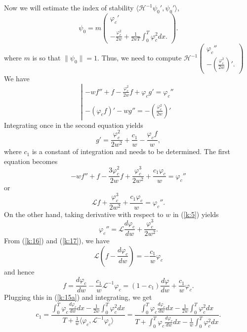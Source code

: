 \documentclass[final,11pt,leqno]{amsart}
\begin{document}
Now we will estimate the index of stability $\langle {\mathcal H}^{-1} \psi_0', \psi_0'\rangle$,
$$
\psi_0=m\left( \begin{array}{cc}
  {\varphi}_c'\\
  \\
  -{\frac{{\varphi}_c^2}{2w}}+{\frac{1}{2wT}}\int_{0}^{T}{{\varphi}_c^2}dx.
  \end{array}\right).
  $$
where $m$ is so that $\|\psi_0\|=1$.  Thus, we need to compute $ {\mathcal H}^{-1}\left( \begin{array}{cc}
  {\varphi}_c''\\
  -({\frac{{\varphi}_c^2}{2w}})'.
  \end{array}\right)$ We have
    $$\left| \begin{array}{ll}
    -wf''+f-{\frac{{\varphi}_c^2}{2w}}f+{\varphi}_cg'={\varphi}_c'' \\
    \\
    -({\varphi}_cf)'-wg''=-\left( {\frac{{\varphi}_c^2}{2w}}\right)'\end{array}
    \right. $$
    Integrating once in the second equation yields
      \begin{equation}\label{k:15a}
      g'={\frac{{\varphi}_c^2}{2w^2}}+{\frac{c_1}{w}}-{\frac{{\varphi}_cf}{w}},
      \end{equation}
      where $c_1$ is a constant of integration and needs to be determined.
The first equation becomes
        $$-wf''+f-{\frac{3{\varphi}_c^2}{2w}}f+{\frac{{\varphi}_c^3}{2w^2}}+{\frac{c_1{\varphi}_c}{w}}={\varphi}_c''$$
        or
        \begin{equation}\label{k:16}
        {\mathcal L} f+{\frac{{\varphi}_c^3}{2w^2}}+{\frac{c_1{\varphi}_c}{w}}={\varphi}_c''.
        \end{equation}
        On the other hand, taking derivative with
         respect to $w$ in (\ref{k:5}) yields
        \begin{equation}\label{k:17}
        {\varphi}_c''={\mathcal L}{\frac{d{\varphi}_c}{dw}}+{\frac{{\varphi}_c^3}{2w^2}}.
        \end{equation}
        From (\ref{k:16}) and (\ref{k:17}), we have
          $${\mathcal L}\left(f-{\frac{d{\varphi}_c}{dw}}\right)=-{\frac{c_1}{w}}{\varphi}_c$$
          and hence
          \begin{equation}\label{k:18}
            f={\frac{d{\varphi}_c}{dw}}-{\frac{c_1}{w}}{\mathcal L}^{-1}{\varphi}_c=(1-c_1){\frac{d{\varphi}}{dw}}+{\frac{c_1}{w}}{\varphi}_c.
          \end{equation}
Plugging this in (\ref{k:15a}) and integrating, we get
           \begin{equation}\label{k:19}
               c_1={\frac{\int_{0}^{T}{{\varphi}_c{\frac{d{\varphi}_c}{dw}}}dx-{\frac{1}{2w}}\int_{0}^{T}{{\varphi}_c^2}dx}{T+{\frac{1}{w}}\langle{\varphi}_c, {\mathcal L}^{-1}{\varphi}_c\rangle}}=
               {\frac{\int_{0}^{T}{{\varphi}_c{\frac{d{\varphi}_c}{dw}}}dx-{\frac{1}{2w}}\int_{0}^{T}{{\varphi}_c^2}dx}
               {T+\int_{0}^{T}{{\varphi}_c{\frac{d{\varphi}_c}{dw}}}dx-{\frac{1}{w}}\int_{0}^{T}{{\varphi}_c^2}dx}}.
            \end{equation}
\end{document}
